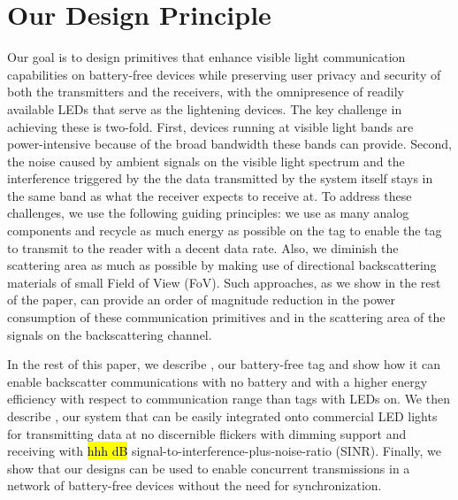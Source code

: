 \section{Our Design Principle}

Our goal is to design primitives that enhance visible light communication capabilities on battery-free devices while preserving user privacy and security of both the transmitters and the receivers, with the omnipresence of readily available LEDs that serve as the lightening devices. The key challenge in achieving these is two-fold. First, devices running at visible light bands are power-intensive because of the broad bandwidth these bands can provide. Second, the noise caused by ambient signals on the visible light spectrum and the interference triggered by the the data transmitted by the system itself stays in the same band as what the receiver expects to receive at. To address these challenges, we use the following guiding principles: we use as many analog components and recycle as much energy as possible on the tag to enable the tag to transmit to the reader with a decent data rate. Also, we diminish the scattering area as much as possible by making use of directional backscattering materials of small Field of View (FoV). Such approaches, as we show in the rest of the paper, can provide an order of magnitude reduction in the power consumption of these communication primitives and in the scattering area of the signals on the backscattering channel.

In the rest of this paper, we describe \vitag, our battery-free tag and show how it can enable backscatter communications with no battery and with a higher energy efficiency with respect to communication range than tags with LEDs on. We then describe \reader, our system that can be easily integrated onto commercial LED lights for transmitting data at no discernible flickers with dimming support and receiving with \hl{hhh dB} signal-to-interference-plus-noise-ratio (SINR). Finally, we show that our designs can be used to enable concurrent transmissions in a network of battery-free devices without the need for synchronization.